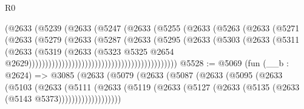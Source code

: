 \begin{lexlean}{R0}
\begin{coremodule}
                                              (@2633
                                                (@5239
                                                  (@2633
                                                    (@5247
                                                      (@2633
                                                        (@5255
                                                          (@2633
                                                            (@5263
                                                              (@2633
                                                                (@5271
                                                                  (@2633
                                                                    (@5279
                                                                      (@2633
                                                                        (@5287
                                                                          (@2633
                                                                            (@5295
                                                                              (@2633
                                                                                (@5303
                                                                                  (@2633
                                                                                    (@5311
                                                                                      (@2633
                                                                                        (@5319
                                                                                          (@2633
                                                                                            (@5323
                                                                                              @5325
                                                                                              @2654
                                                                                              @2629)))))))))))))))))))))))))))))))))))))))))))))
@5528 := @5069
    (fun (__b : @2624) =>
    @3085
      (@2633
        (@5079
          (@2633
            (@5087
              (@2633
                (@5095
                  (@2633
                    (@5103
                      (@2633
                        (@5111
                          (@2633
                            (@5119
                              (@2633 (@5127 (@2633 (@5135 (@2633 (@5143 @5373)))))))))))))))))))

\end{coremodule}
\end{lexlean}
